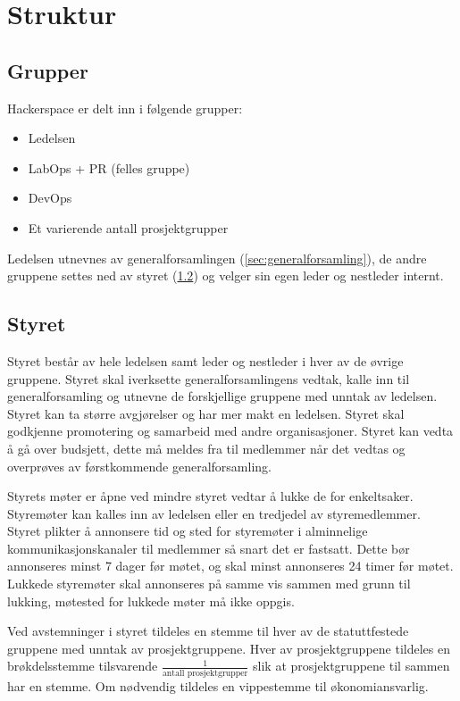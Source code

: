 \section{Struktur}\label{sec:struktur}
\subsection{Grupper}\label{sec:struktur:grupper}
Hackerspace er delt inn i følgende grupper:
\begin{itemize}
\item Ledelsen
\item LabOps + PR (felles gruppe)
\item DevOps
\item Et varierende antall prosjektgrupper
\end{itemize}
Ledelsen utnevnes av generalforsamlingen (\ref{sec:generalforsamling}), de andre gruppene settes ned av styret (\ref{sec:struktur:styret}) og velger sin egen leder og nestleder internt.

\subsection{Styret}\label{sec:struktur:styret}
Styret består av hele ledelsen samt leder og nestleder i hver av de øvrige gruppene.
Styret skal iverksette generalforsamlingens vedtak, kalle inn til generalforsamling og utnevne de forskjellige gruppene med unntak av ledelsen.
Styret kan ta større avgjørelser og har mer makt en ledelsen.
Styret skal godkjenne promotering og samarbeid med andre organisasjoner.
Styret kan vedta å gå over budsjett, dette må meldes fra til medlemmer når det vedtas og overprøves av førstkommende generalforsamling.

Styrets møter er åpne ved mindre styret vedtar å lukke de for enkeltsaker.
Styremøter kan kalles inn av ledelsen eller en tredjedel av styremedlemmer.
Styret plikter å annonsere tid og sted for styremøter i alminnelige kommunikasjonskanaler til medlemmer så snart det er fastsatt.
Dette bør annonseres minst 7 dager før møtet, og skal minst annonseres 24 timer før møtet.
Lukkede styremøter skal annonseres på samme vis sammen med grunn til lukking, møtested for lukkede møter må ikke oppgis.

Ved avstemninger i styret tildeles en stemme til hver av de statuttfestede gruppene med unntak av prosjektgruppene.
Hver av prosjektgruppene tildeles en brøkdelsstemme tilsvarende $\frac{1}{\text{antall prosjektgrupper}}$ slik at prosjektgruppene til sammen har en stemme.
Om nødvendig tildeles en vippestemme til økonomiansvarlig.


